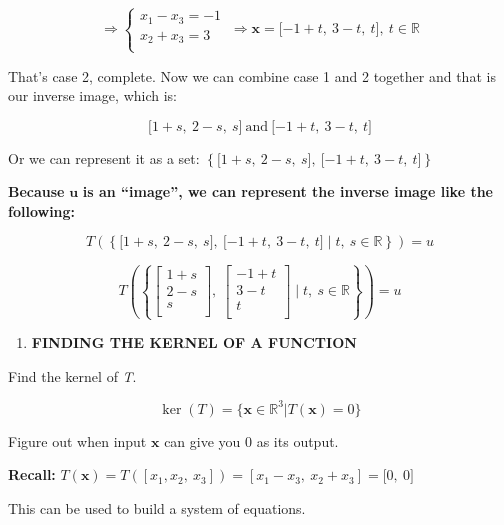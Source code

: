 \documentclass[
]{article}
\begin{document}
$$\Rightarrow \left\{ \begin{matrix}
x_{1} - x_{3} = - 1 \\
x_{2} + x_{3} = 3 \\
\end{matrix} \right.\  \Rightarrow \mathbf{x} = \lbrack - 1 + t,\ 3 - t,\ t\rbrack,\ t\mathbb{\in R}$$

That's case 2, complete. Now we can combine case 1 and 2 together and
that is our inverse image, which is:

$$\lbrack 1 + s,\ 2 - s,\ s\rbrack\ \text{and}\ \lbrack - 1 + t,\ 3 - t,\ t\rbrack$$

Or we can represent it as a set:
$\left\{ \lbrack 1 + s,\ 2 - s,\ s\rbrack,\ \lbrack - 1 + t,\ 3 - t,\ t\rbrack \right\}$

\textbf{Because} $\mathbf{u}$ \textbf{is an ``image'', we can
represent the inverse image like the following:}

$$T\left( \left\{ \lbrack 1 + s,\ 2 - s,\ s\rbrack,\ \lbrack - 1 + t,\ 3 - t,\ t\rbrack\mid t,\ s\mathbb{\in R} \right\} \right) = u$$

$$T\left( \left\{ \begin{bmatrix}
1 + s \\
2 - s \\
s \\
\end{bmatrix},\ \begin{bmatrix}
 - 1 + t \\
3 - t \\
t \\
\end{bmatrix}\mid t,\ s\mathbb{\in R} \right\} \right) = u$$

\begin{enumerate}
\def\labelenumi{\arabic{enumi}.}
\setcounter{enumi}{3}
\item
  \textbf{FINDING THE KERNEL OF A FUNCTION}
\end{enumerate}

Find the kernel of \emph{T}.

$$\ker(T) = \{\mathbf{x} \in \mathbb{R}^{3}|T\left( \mathbf{x} \right) = 0\}$$

Figure out when input $\mathbf{x}$ can give you 0 as its output.

\textbf{Recall:}
$T\left( \mathbf{x} \right) = T\left( \left\lbrack x_{1},x_{2},\ x_{3} \right\rbrack \right) = \left\lbrack x_{1} - x_{3},\ x_{2} + x_{3} \right\rbrack = \lbrack 0,\ 0\rbrack$

This can be used to build a system of equations.
\end{document}
